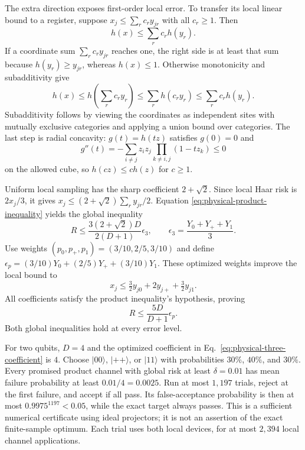 \documentclass[11pt,a4paper]{article}
\newcommand{\ket}[1]{\lvert #1\rangle}
\numberwithin{equation}{section}
\begin{document}
The extra direction exposes first-order local error. To transfer its local linear bound to a register, suppose $x_j\le\sum_r c_ry_{jr}$ with all $c_r\ge1$. Then
\begin{equation}
 h(x)\le\sum_r c_rh(y_r).
 \label{eq:physical-product-inequality}
\end{equation}
If a coordinate sum $\sum_rc_ry_{jr}$ reaches one, the right side is at least that sum because $h(y_r)\ge y_{jr}$, whereas $h(x)\le1$. Otherwise monotonicity and subadditivity give
\[
 h(x)\le h\!\left(\sum_rc_ry_r\right)
 \le\sum_rh(c_ry_r)\le\sum_rc_rh(y_r).
\]
Subadditivity follows by viewing the coordinates as independent sites with mutually exclusive categories and applying a union bound over categories. The last step is radial concavity: $g(t)=h(tz)$ satisfies $g(0)=0$ and
\[
 g''(t)=-\sum_{i\ne j}z_iz_j\prod_{k\ne i,j}(1-tz_k)\le0
\]
on the allowed cube, so $h(cz)\le ch(z)$ for $c\ge1$.

Uniform local sampling has the sharp coefficient $2+\sqrt2$. Since local Haar risk is $2x_j/3$, it gives
$x_j\le(2+\sqrt2)\sum_ry_{jr}/2$. Equation \eqref{eq:physical-product-inequality} yields the global inequality
\[
 R\le\frac{3(2+\sqrt2)D}{2(D+1)}\epsilon_3,
 \qquad\epsilon_3=\frac{Y_0+Y_++Y_1}{3}.
\]
Use weights $(p_0,p_+,p_1)=(3/10,2/5,3/10)$ and define $\epsilon_p=(3/10)Y_0+(2/5)Y_++(3/10)Y_1$. These optimized weights improve the local bound to
\[
 x_j\le\tfrac32y_{j0}+2y_{j+}+\tfrac32y_{j1}.
\]
All coefficients satisfy the product inequality's hypothesis, proving
\begin{equation}
 R\le\frac{5D}{D+1}\epsilon_p.
 \label{eq:physical-three-coefficient}
\end{equation}
Both global inequalities hold at every error level.

For two qubits, $D=4$ and the optimized coefficient in
Eq.~\eqref{eq:physical-three-coefficient} is $4$. Choose $\ket{00}$,
$\ket{++}$, or $\ket{11}$ with probabilities $30\%$, $40\%$, and $30\%$.
Every promised product channel with global risk at least $\delta=0.01$
has mean failure probability at least $0.01/4=0.0025$. Run at most $1{,}197$ trials, reject at the first failure, and accept if all pass. Its false-acceptance probability is
then at most $0.9975^{1197}<0.05$, while the exact target always passes.
This is a sufficient numerical certificate using ideal projectors; it is
not an assertion of the exact finite-sample optimum. Each trial uses both local devices, for at most $2{,}394$ local channel applications.
\end{document}

